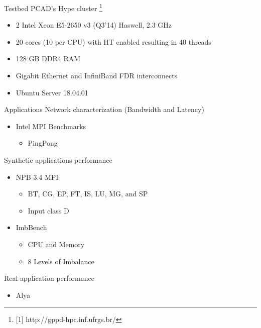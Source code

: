 \documentclass[presentation]{beamer}
\begin{document}
\begin{frame}{Testbed}
PCAD's Hype cluster \footnote{[1] http://gppd-hpc.inf.ufrgs.br/}
\begin{itemize}
\item 2 \texttimes{} Intel Xeon E5-2650 v3 (Q3'14) Haswell, 2.3 GHz
\item 20 cores (10 per CPU) with HT enabled resulting in 40 threads
\item 128 GB DDR4 RAM
\item Gigabit Ethernet and InfiniBand FDR interconnects
\item Ubuntu Server 18.04.01
\end{itemize}
\end{frame}


\begin{frame}{Applications}
Network characterization (Bandwidth and Latency)
    \begin{itemize}
        \item Intel MPI Benchmarks 
        \begin{itemize}
            \item PingPong
        \end{itemize}
    \end{itemize}
    \pause \vfill
Synthetic applications performance
    \begin{itemize}
        \item NPB 3.4 MPI
        \begin{itemize}
            \item BT, CG, EP, FT, IS, LU, MG, and SP
            \item Input class D
        \pause \vfill
        \end{itemize}
        \item ImbBench 
        \begin{itemize}
            \item CPU and Memory
            \item 8 Levels of Imbalance
        \end{itemize}
        \end{itemize}
        \pause \vfill
Real application performance
    \begin{itemize}
        \item Alya
    \end{itemize}
\end{frame}
\end{document}
